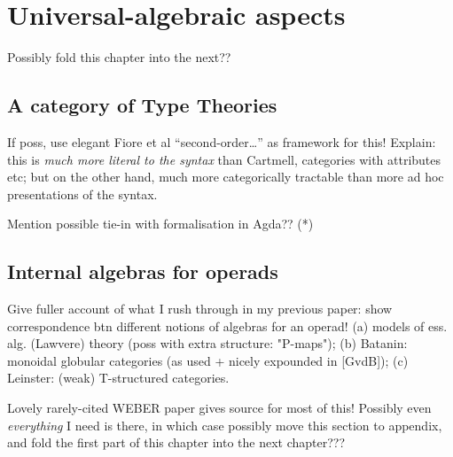 
\chapter{Universal-algebraic aspects}



Possibly fold this chapter into the next??

\section{A category of Type Theories}

\para If poss, use elegant Fiore et al ``second-order\ldots '' as framework for this!  Explain: this is \emph{much more literal to the syntax} than Cartmell, categories with attributes etc; but on the other hand, much more categorically tractable than more ad hoc presentations of the syntax.

Mention possible tie-in with formalisation in Agda??  (*)

\section{Internal algebras for operads}

\para Give fuller account of what I rush through in my previous paper: show  correspondence btn different notions of algebras for an operad!  (a) models of ess. alg. (Lawvere) theory (poss with extra structure: "P-maps"); (b) Batanin: monoidal globular categories (as used + nicely expounded in [GvdB]); (c) Leinster: (weak) T-structured categories.

Lovely rarely-cited WEBER paper gives source for most of this!  Possibly even \emph{everything} I need is there, in which case possibly move this section to appendix, and fold the first part of this chapter into the next chapter???


